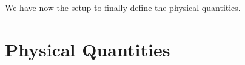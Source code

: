 We have now the setup to finally define the physical quantities.

\section{Physical Quantities}\label{NewPhysicQuants}
%
